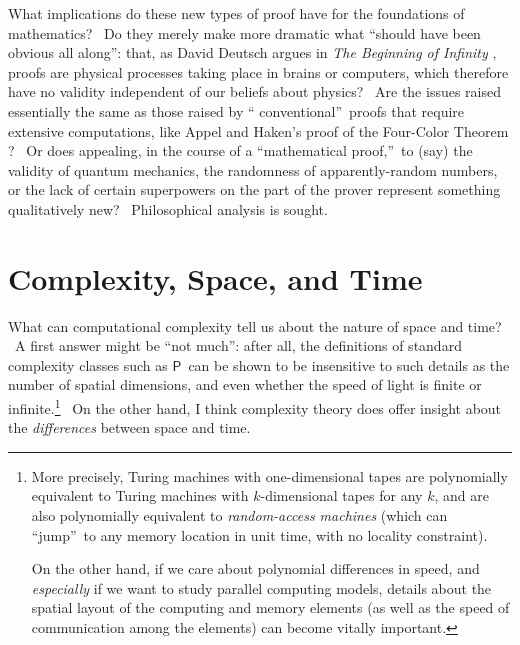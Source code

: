 \documentclass[11pt,onecolumn]{article}%
\begin{document}
What implications do these new types of proof have for the foundations of
mathematics? \ Do they merely make more dramatic what \textquotedblleft should
have been obvious all along\textquotedblright: that, as David Deutsch argues
in \textit{The Beginning of Infinity} \cite{deutsch:infinity}, proofs are
physical processes taking place in brains or computers, which therefore have
no validity independent of our beliefs about physics? \ Are the issues raised
essentially the same as those raised by \textquotedblleft
conventional\textquotedblright\ proofs that require extensive computations,
like Appel and Haken's proof of the Four-Color Theorem \cite{appelhaken}? \ Or
does appealing, in the course of a \textquotedblleft mathematical
proof,\textquotedblright\ to (say) the validity of quantum mechanics, the
randomness of apparently-random numbers, or the lack of certain superpowers on
the part of the prover represent something qualitatively new? \ Philosophical
analysis is sought.

\section{Complexity, Space, and Time\label{TIME}}

What can computational complexity tell us about the nature of space and time?
\ A first answer might be \textquotedblleft not much\textquotedblright: after
all, the definitions of standard complexity classes such as $\mathsf{P}$\ can
be shown to be insensitive to such details as the number of spatial
dimensions, and even whether the speed of light is finite or
infinite.\footnote{More precisely, Turing machines with one-dimensional tapes
are polynomially equivalent to Turing machines with $k$-dimensional tapes for
any $k$, and are also polynomially equivalent to \textit{random-access
machines} (which can \textquotedblleft jump\textquotedblright\ to any memory
location in unit time, with no locality constraint).
\par
On the other hand, if we care about polynomial differences in speed, and
\textit{especially} if we want to study parallel computing models, details
about the spatial layout of the computing and memory elements (as well as the
speed of communication among the elements) can become vitally important.} \ On
the other hand, I think complexity theory does offer insight about the
\textit{differences} between space and time.
\end{document}
